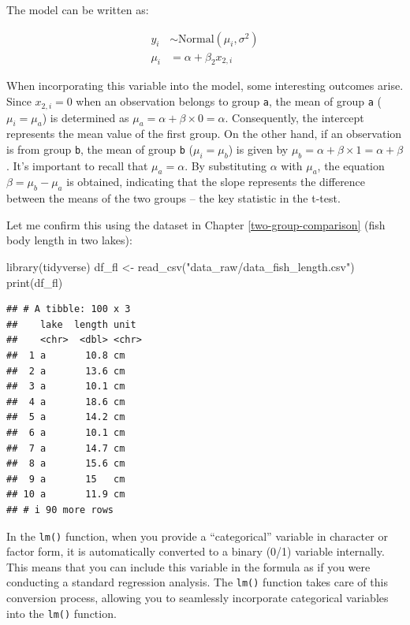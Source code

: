 \documentclass[
]{article}
\newenvironment{Shaded}{\begin{snugshade}}{\end{snugshade}}
\newcommand{\FunctionTok}[1]{\textcolor[rgb]{0.00,0.00,0.00}{#1}}
\newcommand{\NormalTok}[1]{#1}
\newcommand{\OtherTok}[1]{\textcolor[rgb]{0.56,0.35,0.01}{#1}}
\newcommand{\StringTok}[1]{\textcolor[rgb]{0.31,0.60,0.02}{#1}}
\begin{document}
The model can be written as:

\[
\begin{aligned}
y_i &\sim \text{Normal}(\mu_i, \sigma^2)\\
\mu_i &= \alpha + \beta_2 x_{2,i}
\end{aligned}
\]

When incorporating this variable into the model, some interesting outcomes arise. Since \(x_{2,i} = 0\) when an observation belongs to group \texttt{a}, the mean of group \texttt{a} (\(\mu_i = \mu_a\)) is determined as \(\mu_a = \alpha + \beta \times 0 = \alpha\). Consequently, the intercept represents the mean value of the first group. On the other hand, if an observation is from group \texttt{b}, the mean of group \texttt{b} (\(\mu_i = \mu_b\)) is given by \(\mu_b = \alpha + \beta \times 1 = \alpha + \beta\). It's important to recall that \(\mu_a = \alpha\). By substituting \(\alpha\) with \(\mu_a\), the equation \(\beta = \mu_b - \mu_a\) is obtained, indicating that the slope represents the difference between the means of the two groups -- the key statistic in the t-test.

Let me confirm this using the dataset in Chapter \ref{two-group-comparison} (fish body length in two lakes):

\begin{Shaded}
\begin{Highlighting}[]
\FunctionTok{library}\NormalTok{(tidyverse)}
\NormalTok{df\_fl }\OtherTok{\textless{}{-}} \FunctionTok{read\_csv}\NormalTok{(}\StringTok{"data\_raw/data\_fish\_length.csv"}\NormalTok{)}
\FunctionTok{print}\NormalTok{(df\_fl)}
\end{Highlighting}
\end{Shaded}

\begin{verbatim}
## # A tibble: 100 x 3
##    lake  length unit 
##    <chr>  <dbl> <chr>
##  1 a       10.8 cm   
##  2 a       13.6 cm   
##  3 a       10.1 cm   
##  4 a       18.6 cm   
##  5 a       14.2 cm   
##  6 a       10.1 cm   
##  7 a       14.7 cm   
##  8 a       15.6 cm   
##  9 a       15   cm   
## 10 a       11.9 cm   
## # i 90 more rows
\end{verbatim}

In the \texttt{lm()} function, when you provide a ``categorical'' variable in character or factor form, it is automatically converted to a binary (0/1) variable internally. This means that you can include this variable in the formula as if you were conducting a standard regression analysis. The \texttt{lm()} function takes care of this conversion process, allowing you to seamlessly incorporate categorical variables into the \texttt{lm()} function.
\end{document}
